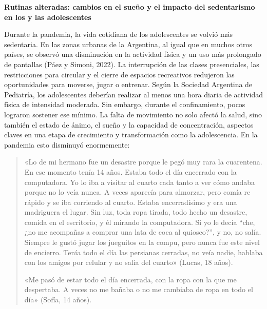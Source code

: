 \textbf{Rutinas alteradas: cambios en el sueño y el impacto del sedentarismo en los y las adolescentes}

Durante la pandemia, la vida cotidiana de los adolescentes se volvió más sedentaria. En las zonas urbanas de la Argentina, al igual que en muchos otros países, se observó una disminución en la actividad física y un uso más prolongado de pantallas (Páez y Simoni, 2022). La interrupción de las clases presenciales, las restricciones para circular y el cierre de espacios recreativos redujeron las oportunidades para moverse, jugar o entrenar. Según la Sociedad Argentina de Pediatría, los adolescentes deberían realizar al menos una hora diaria de actividad física de intensidad moderada. Sin embargo, durante el confinamiento, pocos lograron sostener ese mínimo. La falta de movimiento no solo afectó la salud, sino también el estado de ánimo, el sueño y la capacidad de concentración, aspectos claves en una etapa de crecimiento y transformación como la adolescencia. En la pandemia esto disminuyó enormemente:

\begin{quote}
«Lo de mi hermano fue un desastre porque le pegó muy rara la cuarentena. En ese momento tenía 14 años. Estaba todo el día encerrado con la computadora. Yo lo iba a visitar al cuarto cada tanto a ver cómo andaba porque no lo veía nunca. A veces aparecía para almorzar, pero comía re rápido y se iba corriendo al cuarto. Estaba encerradísimo y era una madriguera el lugar. Sin luz, toda ropa tirada, todo hecho un desastre, comida en el escritorio, y él mirando la computadora. Si yo le decía ``che, ¿no me acompañas a comprar una lata de coca al quiosco?'', y no, no salía. Siempre le gustó jugar los jueguitos en la compu, pero nunca fue este nivel de encierro. Tenía todo el día las persianas cerradas, no veía nadie, hablaba con los amigos por celular y no salía del cuarto» (Lucas, 18 años).

«Me pasó de estar todo el día encerrada, con la ropa con la que me despertaba. A veces no me bañaba o no me cambiaba de ropa en todo el día» (Sofía, 14 años).
\end{quote}

